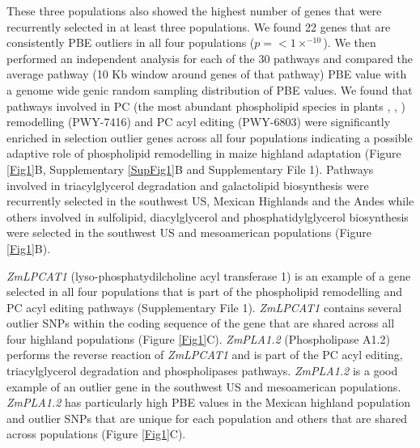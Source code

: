 \documentclass[9pt,twocolumn,twoside,lineno]{BioRxiv}
\begin{document}
These three populations also showed the highest number of genes that were recurrently selected in at least three populations.
We found 22 genes that are consistently PBE outliers in all four populations ($p =<1  \times  ^{-10}$). 
We then performed an independent analysis for each of the 30 pathways and compared the average pathway (10 Kb window around genes of that pathway) PBE value with a genome wide genic random sampling distribution of PBE values. 
We found that pathways involved in PC (the most abundant phospholipid species in plants \cite{Gu2017-nd}, \cite{Poincelot1976-qe}, \cite{Hawke1974-ab}) remodelling (PWY-7416) and PC acyl editing (PWY-6803) were significantly enriched in selection outlier genes across all four populations indicating a possible adaptive role of phospholipid remodelling in maize highland adaptation (Figure \ref{Fig1}B, Supplementary \ref{SupFig1}B and Supplementary File 1). 
Pathways involved in triacylglycerol degradation and galactolipid biosynthesis were recurrently selected in the southwest US, Mexican Highlands and the Andes while others involved in sulfolipid, diacylglycerol and phosphatidylglycerol biosynthesis were selected in the southwest US and mesoamerican populations (Figure \ref{Fig1}B).  

\textit{ZmLPCAT1} (lyso-phosphatydilcholine acyl transferase 1) is an example of a gene selected in all four populations that is part of the phospholipid remodelling and PC acyl editing pathways (Supplementary File 1).
\textit{ZmLPCAT1} contains several outlier SNPs within the coding sequence of the gene that are shared across all four highland populations (Figure \ref{Fig1}C). 
\textit{ZmPLA1.2} (Phospholipase A1.2) performs the reverse reaction of \textit{ZmLPCAT1} and is part of the PC acyl editing, triacylglycerol degradation and phospholipases pathways. 
\textit{ZmPLA1.2} is a good example of an outlier gene in the southwest US and mesoamerican populations.
\textit{ZmPLA1.2} has particularly high PBE values in the Mexican highland population and outlier SNPs that are unique for each population and others that are shared across populations (Figure \ref{Fig1}C). 
\end{document}
